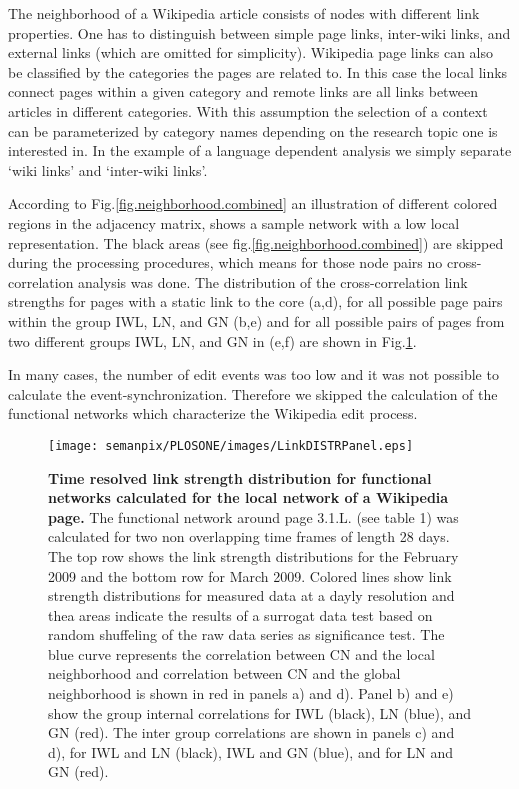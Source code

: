 \documentclass[a4paper,10pt]{scrbook}
\begin{document}
The neighborhood of a Wikipedia article consists of nodes with different link
properties. One has to distinguish between simple page links, inter-wiki links,
and external links (which are omitted for simplicity). Wikipedia page links can
also be classified by the categories the pages are related to. In this case
the local links connect pages within a given category and remote links
are all links between articles in different categories. With this assumption
the selection of a context can be parameterized by category names depending on
the research topic one is interested in. In the example of a language dependent
analysis we simply separate `wiki links' and `inter-wiki links'.

According to Fig.\ref{fig.neighborhood.combined} an illustration of
different colored regions in the adjacency matrix, shows a sample network with a
 low local representation. The black areas (see
fig.\ref{fig.neighborhood.combined}) are skipped during the processing
procedures, which means for those
node pairs no cross-correlation analysis was done.
The distribution of the cross-correlation link strengths for pages with a static
link to the core (a,d), for all possible page pairs within the group IWL, LN,
and GN (b,e) and for all possible pairs of pages from two different groups IWL,
LN, and GN in (e,f) are shown in Fig.\ref{fig.RES.LinkDistr.timeevolution}.

In many cases, the number of edit events was too low and it was not possible
to calculate the event-synchronization. Therefore we skipped the calculation of
the functional networks which characterize the Wikipedia edit process.


\begin{figure}[!ht]
\begin{center}
\texttt{[image: semanpix/PLOSONE/images/LinkDISTRPanel.eps]}
\end{center}
\caption{
{\bf Time resolved link strength distribution for functional networks
calculated for the local network of a Wikipedia page.} The functional
network around page 3.1.L. (see table 1) was calculated for two non
overlapping time frames of length 28 days. The top row shows the link strength
distributions for the February 2009 and the bottom row for March 2009.
Colored lines show link strength distributions for measured data at a dayly
resolution and thea areas indicate the results of a surrogat data test based
on random shuffeling of the raw data series as significance test.
The blue curve represents the correlation between CN and the local neighborhood
and correlation between CN and the global neighborhood is shown in red in
panels a) and d). Panel b) and e) show the group internal correlations for IWL
(black), LN (blue), and GN (red). The inter group correlations are shown in
panels c) and d), for IWL and LN (black), IWL and GN (blue), and for LN and GN
(red).
}
\label{fig.RES.LinkDistr.timeevolution}
\end{figure}
\end{document}
